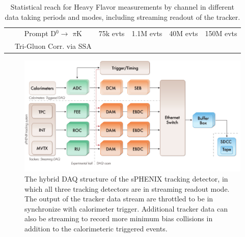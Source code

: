 \begin{table}
\begin{tabular}{|c|c|c|c|c|c|}
        &
        Prompt D$^{0} \rightarrow$ $\pi$K  
        & 75k evts  
        & 1.1M evts
        & 40M evts 
        & 150M evts \\ 
         & Tri-Gluon Corr. via SSA 
        &   
        &  
        & 
        &  \\ \hline 
        
    \end{tabular}
    \caption{Statistical reach for Heavy Flavor \pp measurements by channel in different data taking periods and modes, including streaming readout of the tracker.}
    \label{tab:HFppreach}
\end{table}
 




\begin{figure}[htbp]
\begin{center}
\includegraphics[width=.8\linewidth]{figs/DAQ structure_rev3.pdf}
\caption{The hybrid DAQ structure of the sPHENIX tracking detector, in which  all three tracking detectors are in streaming readout mode. The output of the tracker data stream are throttled to be in synchronize with calorimeter trigger. Additional tracker data can also be streaming to record more minimum bias collisions in addition to the calorimeteric triggered events.}
\label{fig:TPC-DAQ-structure}
\end{center}
\end{figure}
